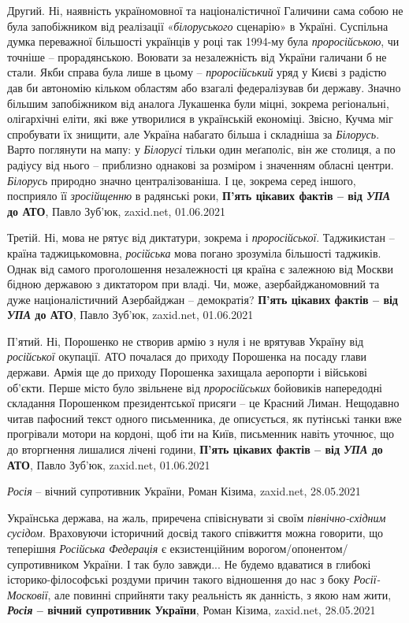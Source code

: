 Другий. Ні, наявність україномовної та націоналістичної Галичини сама собою не
була запобіжником від реалізації «\emph{білоруського} сценарію» в Україні. Суспільна
думка переважної більшості українців у році так 1994-му була \emph{проросійською}, чи
точніше – прорадянською. Воювати за незалежність від України галичани б не
стали. Якби справа була лише в цьому – \emph{проросійський} уряд у Києві з радістю дав
би автономію кільком областям або взагалі федералізував би державу. Значно
більшим запобіжником від аналога Лукашенка були міцні, зокрема регіональні,
олігархічні еліти, які вже утворилися в українській економіці. Звісно, Кучма
міг спробувати їх знищити, але Україна набагато більша і складніша за \emph{Білорусь}.
Варто поглянути на мапу: у \emph{Білорусі} тільки один меґаполіс, він же столиця, а по
радіусу від нього – приблизно однакові за розміром і значенням обласні центри.
\emph{Білорусь} природно значно централізованіша. І це, зокрема серед іншого,
посприяло її \emph{зросійщенню} в радянські роки, 
\textbf{П'ять цікавих фактів – від \emph{УПА} до АТО}, Павло Зуб'юк, zaxid.net, 01.06.2021

Третій. Ні, мова не рятує від диктатури, зокрема і \emph{проросійської}. Таджикистан –
країна таджицькомовна, \emph{російська} мова погано зрозуміла більшості таджиків.
Однак від самого проголошення незалежності ця країна є залежною від Москви
бідною державою з диктатором при владі. Чи, може, азербайджаномовний та дуже
націоналістичний Азербайджан – демократія?
\textbf{П'ять цікавих фактів – від \emph{УПА} до АТО}, Павло Зуб'юк, zaxid.net, 01.06.2021

П'ятий. Ні, Порошенко не створив армію з нуля і не врятував Україну від
\emph{російської} окупації. АТО почалася до приходу Порошенка на посаду глави держави.
Армія ще до приходу Порошенка захищала аеропорти і військові об'єкти. Перше
місто було звільнене від \emph{проросійських} бойовиків напередодні складання
Порошенком президентської присяги – це Красний Лиман. Нещодавно читав пафосний
текст одного письменника, де описується, як путінські танки вже прогрівали
мотори на кордоні, щоб іти на Київ, письменник навіть уточнює, що до вторгнення
лишалися лічені години,
\textbf{П'ять цікавих фактів – від \emph{УПА} до АТО}, Павло Зуб'юк, zaxid.net, 01.06.2021

\emph{Росія} – вічний супротивник України, Роман Кізима, zaxid.net, 28.05.2021

Українська держава, на жаль, приречена співіснувати зі своїм \emph{північно-східним
сусідом}. Враховуючи історичний досвід такого співжиття можна говорити, що
теперішня \emph{Російська Федерація} є екзистенційним ворогом/опонентом/супротивником
України. І так було завжди... Не будемо вдаватися в глибокі історико-філософські
роздуми причин такого відношення до нас з боку \emph{Росії-Московії}, але повинні
сприйняти таку реальність як данність, з якою нам жити,
\textbf{\emph{Росія} – вічний супротивник України}, Роман Кізима, zaxid.net, 28.05.2021

